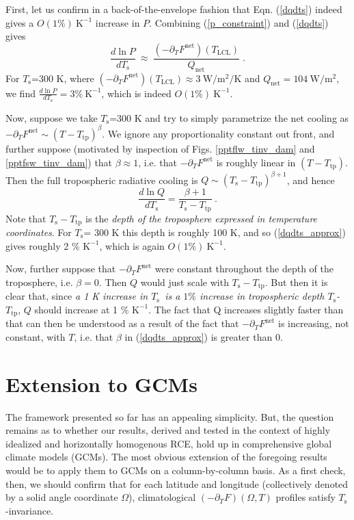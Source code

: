 \documentclass[10pt]{article}
\newcommand{\beqn}{\begin{equation}}
\newcommand{\eeqn}{\end{equation}}
\newcommand{\eqnref}[1]{(\ref{#1})}
\newcommand{\ppt}{\ensuremath{\partial_T}}
\newcommand{\Qnet}{\ensuremath{Q_\mathrm{net}}}
\newcommand{\Fnet}{\ensuremath{F^\mathrm{net}}}
\newcommand{\Wmsq}{\ensuremath{\mathrm{W/m^2}}}
\newcommand{\Ts}{\ensuremath{T_\mathrm{s}}}
\newcommand{\Tlcl}{\ensuremath{T_\mathrm{LCL}}}
\newcommand{\Ttp}{\ensuremath{T_\mathrm{tp}}}
\newcommand{\Kinverse}{\ensuremath{\mathrm{K^{-1}}}}
\begin{document}
First, let us confirm in a back-of-the-envelope fashion that Eqn. \eqnref{dqdts} indeed gives a $O(1\%)\ \Kinverse$ increase in $P$. Combining \eqnref{p_constraint} and \eqnref{dqdts} gives
	\beqn
		\frac{d \ln  P}{d \Ts} \ \approx\  \frac{(-\ppt \Fnet)(\Tlcl)}{\Qnet} \; .
	\label{precip_estimate}
	\eeqn
For \Ts=300 K, where $(-\ppt \Fnet)(\Tlcl) \approx 3 \ \Wmsq/\mathrm{K}$ and $\Qnet =  104\ \Wmsq$, we find $\frac{d \ln  P}{d \Ts}=  3\%\ \Kinverse$, which is indeed  $O(1\%)\ \Kinverse$.

Now, suppose we take \Ts=300 K and  try to simply parametrize the net cooling as $-\ppt \Fnet \sim (T-\Ttp)^\beta$. We ignore any proportionality constant out front, and further suppose (motivated by inspection of Figs. \ref{pptflw_tinv_dam} and \ref{pptfsw_tinv_dam})  that $\beta \approx 1$, i.e. that $-\ppt \Fnet$ is roughly linear in $(T-\Ttp)$. Then the full tropospheric radiative cooling is $Q\sim (\Ts-\Ttp)^{\beta+1}$, and hence 
	\beqn
		\frac{d \ln Q}{d \Ts}  =  \frac{\beta+1}{\Ts-\Ttp}\ . \label{dqdts_approx}
	\eeqn
Note that $\Ts-\Ttp$ is the \emph{depth of the troposphere expressed in temperature coordinates}. For  \Ts= 300 K this depth is roughly 100 K, and so \eqnref{dqdts_approx} gives roughly 2 \% \Kinverse, which is again $O(1\%)\ \Kinverse$.

Now, further suppose that $-\ppt \Fnet$ were constant throughout the depth of the troposphere, i.e. $\beta=0$. Then $Q$ would just scale with $\Ts-\Ttp$. But then it is clear that, since \emph{a 1 K increase in \Ts\  is a $1\%$ increase in tropospheric depth \Ts-\Ttp}, $Q$ should increase at 1 \% \Kinverse. The fact that Q increases slightly faster than that can then be understood as a result of the fact that $-\ppt \Fnet$ is increasing, not constant, with $T$, i.e. that $\beta$ in \eqnref{dqdts_approx} is greater than 0.


\section{Extension to GCMs} \label{sec_GCMs}
The framework presented so far has an appealing simplicity. But, the question remains as to whether our results, derived and tested in the context of highly idealized and horizontally homogenous RCE, hold up in comprehensive global climate models (GCMs). The most obvious extension of the foregoing results would be to apply them to GCMs on a column-by-column basis. As a first check, then, we should confirm that  for each latitude and longitude (collectively denoted  by a solid angle coordinate $\Omega$),  climatological  $(-\ppt F)(\Omega,T)$ profiles satisfy \Ts-invariance. 
\end{document}
